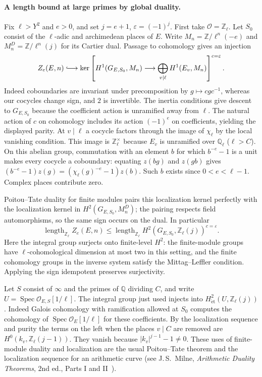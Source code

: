 \paragraph{A length bound at large primes by global duality.}
Fix $\ell>Y^2$ and $e>0$, and set $j=e+1$, $\varepsilon=(-1)^j$.
First take $\mathcal O=\mathbb Z_\ell$. Let $S_0$ consist of the
$\ell$-adic and archimedean places of $E$.
Write $M_n=\mathbb Z/\ell^n(-e)$ and $M_n^D=\mathbb Z/\ell^n(j)$
for its Cartier dual. Passage to cohomology gives an injection
\[
 Z_e(E,n)\lhook\joinrel\longrightarrow
 \ker\left[H^1(G_{E,S_0},M_n)\longrightarrow
           \bigoplus_{v\mid\ell}H^1(E_v,M_n)\right]^{c=\varepsilon}.
\]
Indeed coboundaries are invariant under precomposition by
$g\mapsto cgc^{-1}$, whereas our cocycles change sign, and $2$
is invertible. The inertia conditions give descent to $G_{E,S_0}$
because the coefficient action is unramified away from $\ell$.
The natural action of $c$ on cohomology includes its action
$(-1)^e$ on coefficients, yielding the displayed parity. At
$v\mid\ell$ a cocycle factors through the image of $\chi_\ell$ by
the local vanishing condition. This image is $\mathbb Z_\ell^\times$
because $E_v$ is unramified over $\mathbb Q_\ell$ ($\ell>C$).
On this abelian group, commutation with an element $b$ for which
$b^{-e}-1$ is a unit makes every cocycle a coboundary: equating
$z(bg)$ and $z(gb)$ gives $(b^{-e}-1)z(g)=(\chi_\ell(g)^{-e}-1)z(b)$.
Such $b$ exists since $0<e<\ell-1$. Complex places contribute zero.

Poitou--Tate duality for finite modules pairs this localization
kernel perfectly with the localization kernel in
$H^2(G_{E,S_0},M_n^D)$; the pairing respects field automorphisms,
so the same sign occurs on the dual. In particular
\[
 \operatorname{length}_{\mathbb Z_\ell}Z_e(E,n)
 \le \operatorname{length}_{\mathbb Z_\ell}
       H^2(G_{E,S_0},\mathbb Z_\ell(j))^{c=\varepsilon}.
\]
Here the integral group surjects onto finite-level $H^2$:
the finite-module groups have $\ell$-cohomological dimension at most
two in this setting, and the finite cohomology groups in the inverse
system satisfy the Mittag--Leffler condition. Applying the sign
idempotent preserves surjectivity.

Let $S$ consist of $\infty$ and the primes of $\mathbb Q$ dividing $C$,
and write $U=\operatorname{Spec}\mathcal O_{E,S}[1/\ell]$.
The integral group just used injects into
$H^2_{\mathrm{\acute et}}(U,\mathbb Z_\ell(j))$. Indeed Galois cohomology
with ramification allowed at $S_0$ computes the cohomology of
$\operatorname{Spec}\mathcal O_E[1/\ell]$ for these coefficients.
By the localization sequence and purity the terms on the left when
the places $v\mid C$ are removed are $H^0(k_v,\mathbb Z_\ell(j-1))$.
They vanish because $|k_v|^{j-1}-1\ne0$.
These uses of finite-module duality and localization are the usual
Poitou--Tate theorem and the localization sequence for an arithmetic
curve (see J.\,S.~Milne, \emph{Arithmetic Duality Theorems}, 2nd ed.,
Parts I and II~\cite{milneADT}).

